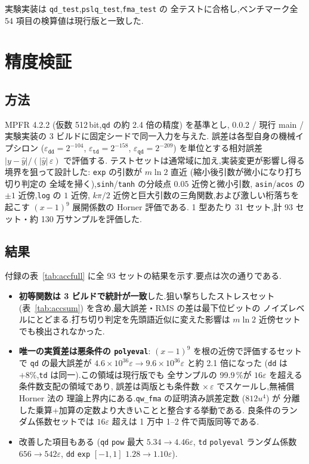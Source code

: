 \documentclass[a4paper,10pt]{ltjsarticle}
\begin{document}
実験実装は \texttt{qd\_test},\texttt{pslq\_test},\texttt{fma\_test} の
全テストに合格し,ベンチマーク全 54 項目の検算値は現行版と一致した.

\section{精度検証}
\label{sec:acc}

\subsection{方法}

MPFR 4.2.2 (仮数 512\,bit,\texttt{qd} の約 2.4 倍の精度) を基準とし,
0.0.2 / 現行 main / 実験実装の 3 ビルドに固定シードで同一入力を与えた.
誤差は各型自身の機械イプシロン
($\varepsilon_{\texttt{dd}}=2^{-104}$,
 $\varepsilon_{\texttt{td}}=2^{-158}$,
 $\varepsilon_{\texttt{qd}}=2^{-209}$) を単位とする相対誤差
$|y - \hat y| / (|\hat y|\,\varepsilon)$ で評価する.
テストセットは通常域に加え,実装変更が影響し得る境界を狙って設計した:
\texttt{exp} の引数が $m\ln 2$ 直近 (縮小後引数が微小になり打ち切り判定の
全域を掃く),\texttt{sinh}/\texttt{tanh} の分岐点 $0.05$ 近傍と微小引数,
\texttt{asin}/\texttt{acos} の $\pm1$ 近傍,\texttt{log} の $1$ 近傍,
$k\pi/2$ 近傍と巨大引数の三角関数,および激しい桁落ちを起こす
$(x-1)^9$ 展開係数の Horner 評価である.
1 型あたり 31 セット,計 93 セット・約 130 万サンプルを評価した.

\subsection{結果}

付録の表~\ref{tab:accfull} に全 93 セットの結果を示す.要点は次の通りである.

\begin{itemize}
  \item \textbf{初等関数は 3 ビルドで統計が一致}した.狙い撃ちしたストレスセット
        (表~\ref{tab:accsum}) を含め,最大誤差・RMS の差は最下位ビットの
        ノイズレベルにとどまる.打ち切り判定を先頭語近似に変えた影響は
        $m\ln 2$ 近傍セットでも検出されなかった.
  \item \textbf{唯一の実質差は悪条件の \texttt{polyeval}}:
        $(x-1)^9$ を根の近傍で評価するセットで \texttt{qd} の最大誤差が
        $4.6\times10^{36}\varepsilon \to 9.6\times10^{36}\varepsilon$ と約 2.1 倍になった
        (\texttt{dd} は $+8\%$,\texttt{td} は同一).この領域は現行版でも
        全サンプルの 99.9\,\%が $16\varepsilon$ を超える条件数支配の領域であり,
        誤差は両版とも条件数 $\times\,\varepsilon$ でスケールし,無補償 Horner 法の
        理論上界内にある.\texttt{qw\_fma} の証明済み誤差定数 ($812u^4$) が
        分離した乗算+加算の定数より大きいことと整合する挙動である.
        良条件のランダム係数セットでは $16\varepsilon$ 超えは 1 万中 1--2 件で両版同等である.
  \item 改善した項目もある (\texttt{qd} \texttt{pow} 最大 $5.34\to4.46\varepsilon$,
        \texttt{td} \texttt{polyeval} ランダム係数 $656\to542\varepsilon$,
        \texttt{dd} \texttt{exp} $[-1,1]$ $1.28\to1.10\varepsilon$).
\end{itemize}
\end{document}
